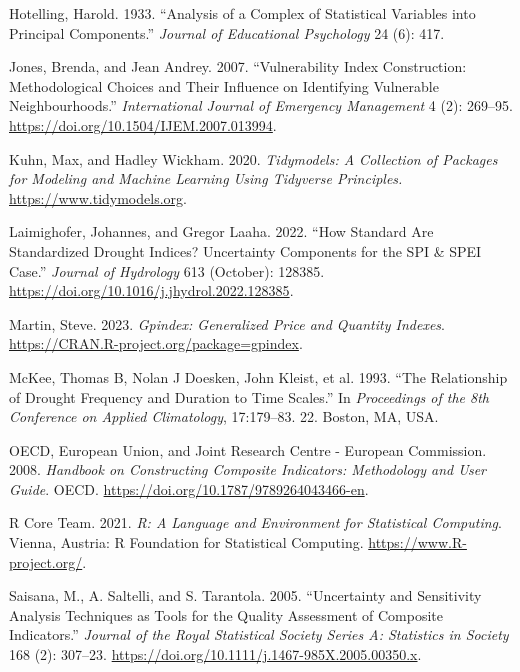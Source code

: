 \documentclass[
]{interact}
\newlength{\cslhangindent}
\newlength{\cslentryspacingunit} %
\newenvironment{CSLReferences}[2] %
 {%
  \setlength{\parindent}{0pt}
  \ifodd #1
  \let\oldpar\par
  \def\par{\hangindent=\cslhangindent\oldpar}
  \fi
  \setlength{\parskip}{#2\cslentryspacingunit}
 }%
 {}
\begin{document}
\begin{CSLReferences}{1}{0}
\leavevmode{}%
Hotelling, Harold. 1933. {``Analysis of a Complex of Statistical
Variables into Principal Components.''} \emph{Journal of Educational
Psychology} 24 (6): 417.

\leavevmode{}%
Jones, Brenda, and Jean Andrey. 2007. {``Vulnerability Index
Construction: Methodological Choices and Their Influence on Identifying
Vulnerable Neighbourhoods.''} \emph{International Journal of Emergency
Management} 4 (2): 269--95.
\url{https://doi.org/10.1504/IJEM.2007.013994}.

\leavevmode{}%
Kuhn, Max, and Hadley Wickham. 2020. \emph{Tidymodels: A Collection of
Packages for Modeling and Machine Learning Using Tidyverse Principles.}
\url{https://www.tidymodels.org}.

\leavevmode{}%
Laimighofer, Johannes, and Gregor Laaha. 2022. {``How Standard Are
Standardized Drought Indices? {Uncertainty} Components for the {SPI} \&
{SPEI} Case.''} \emph{Journal of Hydrology} 613 (October): 128385.
\url{https://doi.org/10.1016/j.jhydrol.2022.128385}.

\leavevmode{}%
Martin, Steve. 2023. \emph{Gpindex: Generalized Price and Quantity
Indexes}. \url{https://CRAN.R-project.org/package=gpindex}.

\leavevmode{}%
McKee, Thomas B, Nolan J Doesken, John Kleist, et al. 1993. {``The
Relationship of Drought Frequency and Duration to Time Scales.''} In
\emph{Proceedings of the 8th Conference on Applied Climatology},
17:179--83. 22. Boston, MA, USA.

\leavevmode{}%
OECD, European Union, and Joint Research Centre - European Commission.
2008. \emph{Handbook on {Constructing} {Composite} {Indicators}:
{Methodology} and {User} {Guide}}. OECD.
\url{https://doi.org/10.1787/9789264043466-en}.

\leavevmode{}%
R Core Team. 2021. \emph{R: A Language and Environment for Statistical
Computing}. Vienna, Austria: R Foundation for Statistical Computing.
\url{https://www.R-project.org/}.

\leavevmode{}%
Saisana, M., A. Saltelli, and S. Tarantola. 2005. {``{Uncertainty and
Sensitivity Analysis Techniques as Tools for the Quality Assessment of
Composite Indicators}.''} \emph{Journal of the Royal Statistical Society
Series A: Statistics in Society} 168 (2): 307--23.
\url{https://doi.org/10.1111/j.1467-985X.2005.00350.x}.


\end{CSLReferences}
\end{document}
